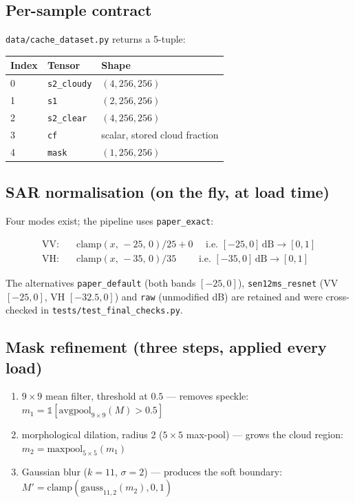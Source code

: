 \documentclass[10pt,a4paper]{article}
\newcommand{\code}[1]{\texttt{#1}}
\begin{document}
\subsection{Per-sample contract}

\code{data/cache\_dataset.py} returns a 5-tuple:

\begin{center}
\begin{tabular}{@{}lll@{}}
\hline
Index & Tensor & Shape \\
\hline
0 & \code{s2\_cloudy} & $(4,256,256)$ \\
1 & \code{s1}        & $(2,256,256)$ \\
2 & \code{s2\_clear} & $(4,256,256)$ \\
3 & \code{cf}        & scalar, stored cloud fraction \\
4 & \code{mask}      & $(1,256,256)$ \\
\hline
\end{tabular}
\end{center}

\subsection{SAR normalisation (on the fly, at load time)}

Four modes exist; the pipeline uses \code{paper\_exact}:

\begin{align*}
\text{VV}:&\quad \mathrm{clamp}(x,\,-25,\,0)/25 + 0 \quad\text{ i.e. } [-25,0]\,\text{dB} \to [0,1] \\
\text{VH}:&\quad \mathrm{clamp}(x,\,-35,\,0)/35 \qquad\text{ i.e. } [-35,0]\,\text{dB} \to [0,1]
\end{align*}

The alternatives \code{paper\_default} (both bands $[-25,0]$), \code{sen12ms\_resnet}
(VV $[-25,0]$, VH $[-32.5,0]$) and \code{raw} (unmodified dB) are retained and were
cross-checked in \code{tests/test\_final\_checks.py}.

\subsection{Mask refinement (three steps, applied every load)}

\begin{enumerate}
\item $9\times9$ mean filter, threshold at $0.5$ --- removes speckle:
      $m_1 = \mathbb{1}[\mathrm{avgpool}_{9\times9}(M) > 0.5]$
\item morphological dilation, radius 2 ($5\times5$ max-pool) --- grows the cloud region:
      $m_2 = \mathrm{maxpool}_{5\times5}(m_1)$
\item Gaussian blur ($k=11$, $\sigma=2$) --- produces the soft boundary:
      $M' = \mathrm{clamp}(\mathrm{gauss}_{11,2}(m_2), 0, 1)$
\end{enumerate}
\end{document}
